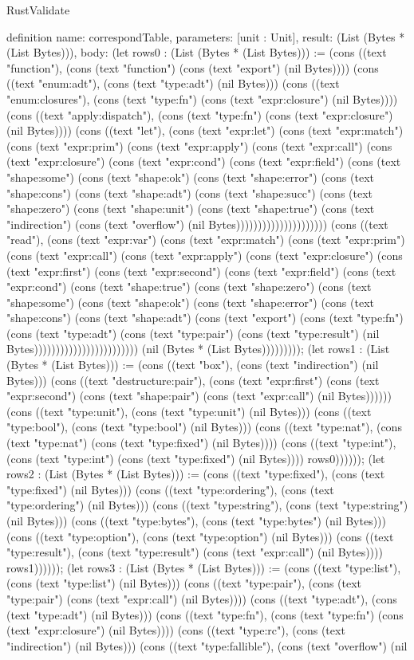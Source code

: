 \begin{lexlean}{RustValidate}
\begin{semanticmodule}
definition{
  name: correspondTable,
  parameters: [unit : Unit],
  result: (List (Bytes * (List Bytes))),
  body: (let rows0 : (List (Bytes * (List Bytes))) := (cons ((text "function"), (cons (text "function") (cons (text "export") (nil Bytes)))) (cons ((text "enum:adt"), (cons (text "type:adt") (nil Bytes))) (cons ((text "enum:closures"), (cons (text "type:fn") (cons (text "expr:closure") (nil Bytes)))) (cons ((text "apply:dispatch"), (cons (text "type:fn") (cons (text "expr:closure") (nil Bytes)))) (cons ((text "let"), (cons (text "expr:let") (cons (text "expr:match") (cons (text "expr:prim") (cons (text "expr:apply") (cons (text "expr:call") (cons (text "expr:closure") (cons (text "expr:cond") (cons (text "expr:field") (cons (text "shape:some") (cons (text "shape:ok") (cons (text "shape:error") (cons (text "shape:cons") (cons (text "shape:adt") (cons (text "shape:succ") (cons (text "shape:zero") (cons (text "shape:unit") (cons (text "shape:true") (cons (text "indirection") (cons (text "overflow") (nil Bytes))))))))))))))))))))) (cons ((text "read"), (cons (text "expr:var") (cons (text "expr:match") (cons (text "expr:prim") (cons (text "expr:call") (cons (text "expr:apply") (cons (text "expr:closure") (cons (text "expr:first") (cons (text "expr:second") (cons (text "expr:field") (cons (text "expr:cond") (cons (text "shape:true") (cons (text "shape:zero") (cons (text "shape:some") (cons (text "shape:ok") (cons (text "shape:error") (cons (text "shape:cons") (cons (text "shape:adt") (cons (text "export") (cons (text "type:fn") (cons (text "type:adt") (cons (text "type:pair") (cons (text "type:result") (nil Bytes)))))))))))))))))))))))) (nil (Bytes * (List Bytes))))))))); (let rows1 : (List (Bytes * (List Bytes))) := (cons ((text "box"), (cons (text "indirection") (nil Bytes))) (cons ((text "destructure:pair"), (cons (text "expr:first") (cons (text "expr:second") (cons (text "shape:pair") (cons (text "expr:call") (nil Bytes)))))) (cons ((text "type:unit"), (cons (text "type:unit") (nil Bytes))) (cons ((text "type:bool"), (cons (text "type:bool") (nil Bytes))) (cons ((text "type:nat"), (cons (text "type:nat") (cons (text "type:fixed") (nil Bytes)))) (cons ((text "type:int"), (cons (text "type:int") (cons (text "type:fixed") (nil Bytes)))) rows0)))))); (let rows2 : (List (Bytes * (List Bytes))) := (cons ((text "type:fixed"), (cons (text "type:fixed") (nil Bytes))) (cons ((text "type:ordering"), (cons (text "type:ordering") (nil Bytes))) (cons ((text "type:string"), (cons (text "type:string") (nil Bytes))) (cons ((text "type:bytes"), (cons (text "type:bytes") (nil Bytes))) (cons ((text "type:option"), (cons (text "type:option") (nil Bytes))) (cons ((text "type:result"), (cons (text "type:result") (cons (text "expr:call") (nil Bytes)))) rows1)))))); (let rows3 : (List (Bytes * (List Bytes))) := (cons ((text "type:list"), (cons (text "type:list") (nil Bytes))) (cons ((text "type:pair"), (cons (text "type:pair") (cons (text "expr:call") (nil Bytes)))) (cons ((text "type:adt"), (cons (text "type:adt") (nil Bytes))) (cons ((text "type:fn"), (cons (text "type:fn") (cons (text "expr:closure") (nil Bytes)))) (cons ((text "type:rc"), (cons (text "indirection") (nil Bytes))) (cons ((text "type:fallible"), (cons (text "overflow") (nil }
\end{semanticmodule}
\end{lexlean}
